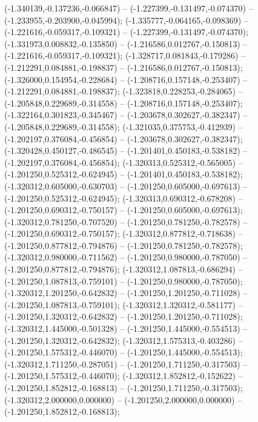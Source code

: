 (-1.340139,-0.137236,-0.066847) -- (-1.227399,-0.131497,-0.074370) -- (-1.233955,-0.203900,-0.045994);
 (-1.335777,-0.064165,-0.098369) -- (-1.221616,-0.059317,-0.109321) -- (-1.227399,-0.131497,-0.074370);
 (-1.331973,0.008832,-0.135850) -- (-1.216586,0.012767,-0.150813) -- (-1.221616,-0.059317,-0.109321);
 (-1.328717,0.081843,-0.179286) -- (-1.212291,0.084881,-0.198837) -- (-1.216586,0.012767,-0.150813);
 (-1.326000,0.154954,-0.228684) -- (-1.208716,0.157148,-0.253407) -- (-1.212291,0.084881,-0.198837);
 (-1.323818,0.228253,-0.284065) -- (-1.205848,0.229689,-0.314558) -- (-1.208716,0.157148,-0.253407);
 (-1.322164,0.301823,-0.345467) -- (-1.203678,0.302627,-0.382347) -- (-1.205848,0.229689,-0.314558);
 (-1.321035,0.375753,-0.412939) -- (-1.202197,0.376084,-0.456854) -- (-1.203678,0.302627,-0.382347);
 (-1.320428,0.450127,-0.486545) -- (-1.201401,0.450183,-0.538182) -- (-1.202197,0.376084,-0.456854);
 (-1.320313,0.525312,-0.565005) -- (-1.201250,0.525312,-0.624945) -- (-1.201401,0.450183,-0.538182);
 (-1.320312,0.605000,-0.630703) -- (-1.201250,0.605000,-0.697613) -- (-1.201250,0.525312,-0.624945);
 (-1.320313,0.690312,-0.678208) -- (-1.201250,0.690312,-0.750157) -- (-1.201250,0.605000,-0.697613);
 (-1.320312,0.781250,-0.707520) -- (-1.201250,0.781250,-0.782578) -- (-1.201250,0.690312,-0.750157);
 (-1.320312,0.877812,-0.718638) -- (-1.201250,0.877812,-0.794876) -- (-1.201250,0.781250,-0.782578);
 (-1.320312,0.980000,-0.711562) -- (-1.201250,0.980000,-0.787050) -- (-1.201250,0.877812,-0.794876);
 (-1.320312,1.087813,-0.686294) -- (-1.201250,1.087813,-0.759101) -- (-1.201250,0.980000,-0.787050);
 (-1.320312,1.201250,-0.642832) -- (-1.201250,1.201250,-0.711028) -- (-1.201250,1.087813,-0.759101);
 (-1.320312,1.320312,-0.581177) -- (-1.201250,1.320312,-0.642832) -- (-1.201250,1.201250,-0.711028);
 (-1.320312,1.445000,-0.501328) -- (-1.201250,1.445000,-0.554513) -- (-1.201250,1.320312,-0.642832);
 (-1.320312,1.575313,-0.403286) -- (-1.201250,1.575312,-0.446070) -- (-1.201250,1.445000,-0.554513);
 (-1.320312,1.711250,-0.287051) -- (-1.201250,1.711250,-0.317503) -- (-1.201250,1.575312,-0.446070);
 (-1.320312,1.852812,-0.152622) -- (-1.201250,1.852812,-0.168813) -- (-1.201250,1.711250,-0.317503);
 (-1.320312,2.000000,0.000000) -- (-1.201250,2.000000,0.000000) -- (-1.201250,1.852812,-0.168813);

